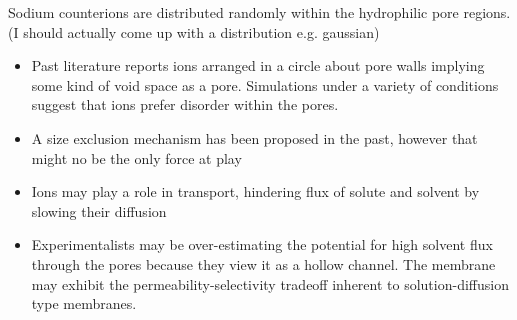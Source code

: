 \documentclass{article}
\begin{document}
	Sodium counterions are distributed randomly within the hydrophilic pore regions. (I should actually come up with a distribution e.g. gaussian)
	\begin{itemize}
		\item Past literature reports ions arranged in a circle about pore walls implying some kind of void space as a pore. Simulations under a variety of conditions suggest that ions prefer disorder within the pores. 
		\item A size exclusion mechanism has been proposed in the past, however that might no be the only force at play
		\item Ions may play a role in transport, hindering flux of solute and solvent by slowing their diffusion
		\item Experimentalists may be over-estimating the potential for high solvent flux through the pores because they view it as a hollow channel. The membrane may exhibit the permeability-selectivity tradeoff inherent to solution-diffusion type membranes. 
        \end{itemize}	
\end{document}
